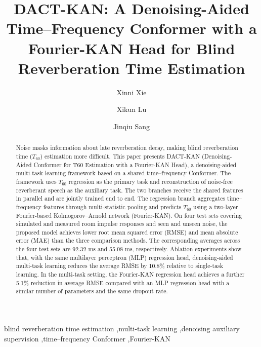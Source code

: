 \documentclass[a4paper,fleqn]{cas-sc}
\begin{document}
\let\WriteBookmarks\relax


\title[mode=title]{DACT-KAN: A Denoising-Aided Time--Frequency Conformer with a Fourier-KAN Head for Blind Reverberation Time Estimation}

\author[1]{Xinni Xie}

\author[1]{Xikun Lu}

\author[1]{Jinqiu Sang}
\cormark[1]




\begin{abstract}
Noise masks information about late reverberation decay, making blind reverberation time ($T_{60}$) estimation more difficult. This paper presents DACT-KAN (Denoising-Aided Conformer for T60 Estimation with a Fourier-KAN Head), a denoising-aided multi-task learning framework based on a shared time--frequency Conformer. The framework uses $T_{60}$ regression as the primary task and reconstruction of noise-free reverberant speech as the auxiliary task. The two branches receive the shared features in parallel and are jointly trained end to end. The regression branch aggregates time--frequency features through multi-statistic pooling and predicts $T_{60}$ using a two-layer Fourier-based Kolmogorov--Arnold network (Fourier-KAN). On four test sets covering simulated and measured room impulse responses and seen and unseen noise, the proposed model achieves lower root mean squared error (RMSE) and mean absolute error (MAE) than the three comparison methods. The corresponding averages across the four test sets are 92.32 ms and 55.08 ms, respectively. Ablation experiments show that, with the same multilayer perceptron (MLP) regression head, denoising-aided multi-task learning reduces the average RMSE by 10.8\% relative to single-task learning. In the multi-task setting, the Fourier-KAN regression head achieves a further 5.1\% reduction in average RMSE compared with an MLP regression head with a similar number of parameters and the same dropout rate.
\end{abstract}


\begin{keywords}
blind reverberation time estimation \sep multi-task learning \sep denoising auxiliary supervision \sep time--frequency Conformer \sep Fourier-KAN
\end{keywords}
\end{document}

